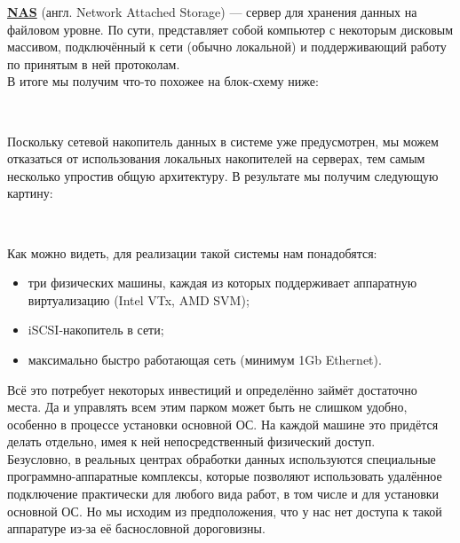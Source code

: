 \documentclass[14pt, a4paper]{article}
\begin{document}
\href{https://ru.wikipedia.org/wiki/NAS}{\textbf{NAS}} (англ. Network Attached Storage) — сервер для хранения данных на файловом уровне. По сути,
представляет собой компьютер с некоторым дисковым массивом, подключённый к сети (обычно
локальной) и поддерживающий работу по принятым в ней протоколам.\\

В итоге мы получим что-то похожее на блок-схему ниже:

\begin{figure}[h]
    \centering
    \\ 
    \label{framework} 
\end{figure}

Поскольку сетевой накопитель данных в системе уже предусмотрен, мы можем отказаться от
использования локальных накопителей на серверах, тем самым несколько упростив общую
архитектуру. В результате мы получим следующую картину:

\begin{figure}[h]
    \centering
    \\ 
    \label{framework} 
\end{figure}

Как можно видеть, для реализации такой системы нам понадобятся:
\begin{itemize}
    \item три физических машины, каждая из которых поддерживает аппаратную виртуализацию (Intel
    VTx, AMD SVM);
    \item iSCSI-накопитель в сети;
    \item максимально быстро работающая сеть (минимум 1Gb Ethernet).
\end{itemize}

Всё это потребует некоторых инвестиций и определённо займёт достаточно места. Да и управлять
всем этим парком может быть не слишком удобно, особенно в процессе установки основной ОС. На
каждой машине это придётся делать отдельно, имея к ней непосредственный физический доступ.\\

Безусловно, в реальных центрах обработки данных используются специальные
программно-аппаратные комплексы, которые позволяют использовать удалённое подключение
практически для любого вида работ, в том числе и для установки основной ОС. Но мы исходим из
предположения, что у нас нет доступа к такой аппаратуре из-за её баснословной дороговизны.\\
\end{document}

